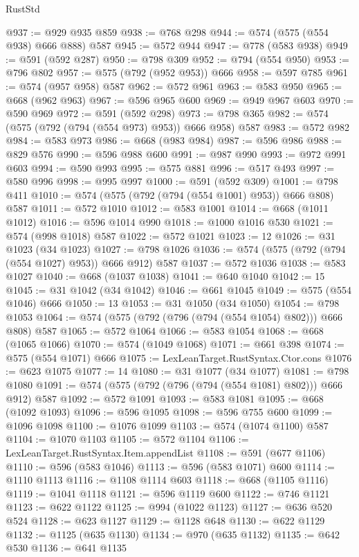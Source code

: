 \begin{lexlean}{RustStd}
\begin{coremodule}
@937 := @929 @935 @859
@938 := @768 @298
@944 := @574 (@575 (@554 @938) @666 @888) @587
@945 := @572 @944
@947 := @778 (@583 @938)
@949 := @591 (@592 @287)
@950 := @798 @309
@952 := @794 (@554 @950)
@953 := @796 @802
@957 := @575 (@792 (@952 @953)) @666
@958 := @597 @785
@961 := @574 (@957 @958) @587
@962 := @572 @961
@963 := @583 @950
@965 := @668 (@962 @963)
@967 := @596 @965 @600
@969 := @949 @967 @603
@970 := @590 @969
@972 := @591 (@592 @298)
@973 := @798 @365
@982 := @574 (@575 (@792 (@794 (@554 @973) @953)) @666 @958) @587
@983 := @572 @982
@984 := @583 @973
@986 := @668 (@983 @984)
@987 := @596 @986
@988 := @829 @576
@990 := @596 @988 @600
@991 := @987 @990
@993 := @972 @991 @603
@994 := @590 @993
@995 := @575 @881
@996 := @517 @493
@997 := @580 @996
@998 := @995 @997
@1000 := @591 (@592 @309)
@1001 := @798 @411
@1010 := @574 (@575 (@792 (@794 (@554 @1001) @953)) @666 @808) @587
@1011 := @572 @1010
@1012 := @583 @1001
@1014 := @668 (@1011 @1012)
@1016 := @596 @1014 @990
@1018 := @1000 @1016 @530
@1021 := @574 (@998 @1018) @587
@1022 := @572 @1021
@1023 := 12
@1026 := @31 @1023 (@34 @1023)
@1027 := @798 @1026
@1036 := @574 (@575 (@792 (@794 (@554 @1027) @953)) @666 @912) @587
@1037 := @572 @1036
@1038 := @583 @1027
@1040 := @668 (@1037 @1038)
@1041 := @640 @1040
@1042 := 15
@1045 := @31 @1042 (@34 @1042)
@1046 := @661 @1045
@1049 := @575 (@554 @1046) @666
@1050 := 13
@1053 := @31 @1050 (@34 @1050)
@1054 := @798 @1053
@1064 := @574 (@575 (@792 (@796 (@794 (@554 @1054) @802))) @666 @808) @587
@1065 := @572 @1064
@1066 := @583 @1054
@1068 := @668 (@1065 @1066)
@1070 := @574 (@1049 @1068)
@1071 := @661 @398
@1074 := @575 (@554 @1071) @666
@1075 := LexLeanTarget.RustSyntax.Ctor.cons
@1076 := @623 @1075
@1077 := 14
@1080 := @31 @1077 (@34 @1077)
@1081 := @798 @1080
@1091 := @574 (@575 (@792 (@796 (@794 (@554 @1081) @802))) @666 @912) @587
@1092 := @572 @1091
@1093 := @583 @1081
@1095 := @668 (@1092 @1093)
@1096 := @596 @1095
@1098 := @596 @755 @600
@1099 := @1096 @1098
@1100 := @1076 @1099
@1103 := @574 (@1074 @1100) @587
@1104 := @1070 @1103
@1105 := @572 @1104
@1106 := LexLeanTarget.RustSyntax.Item.appendList
@1108 := @591 (@677 @1106)
@1110 := @596 (@583 @1046)
@1113 := @596 (@583 @1071) @600
@1114 := @1110 @1113
@1116 := @1108 @1114 @603
@1118 := @668 (@1105 @1116)
@1119 := @1041 @1118
@1121 := @596 @1119 @600
@1122 := @746 @1121
@1123 := @622 @1122
@1125 := @994 (@1022 @1123)
@1127 := @636 @520 @524
@1128 := @623 @1127
@1129 := @1128 @648
@1130 := @622 @1129
@1132 := @1125 (@635 @1130)
@1134 := @970 (@635 @1132)
@1135 := @642 @530
@1136 := @641 @1135

\end{coremodule}
\end{lexlean}

